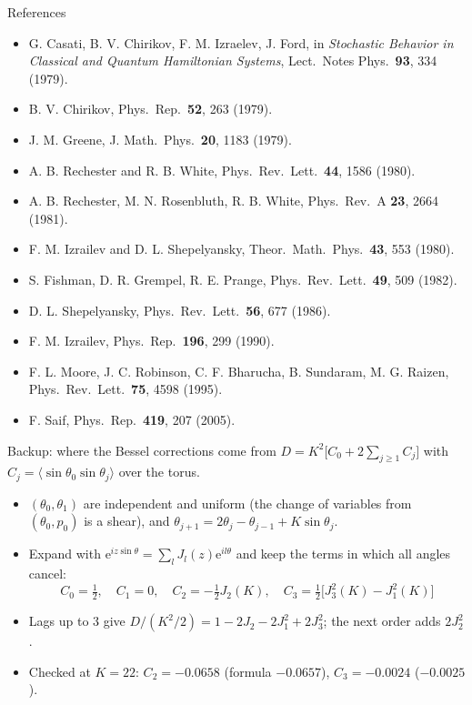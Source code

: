 \documentclass[aspectratio=169,10pt]{beamer}
\newcommand{\avg}[1]{\langle #1 \rangle}
\newcommand{\ee}{\mathrm{e}}
\begin{document}
\begin{frame}{References}
  \scriptsize
  \begin{itemize}
    \item G. Casati, B. V. Chirikov, F. M. Izraelev, J. Ford, in \emph{Stochastic Behavior in Classical and
    Quantum Hamiltonian Systems}, Lect.\ Notes Phys.\ \textbf{93}, 334 (1979).
    \item B. V. Chirikov, Phys.\ Rep.\ \textbf{52}, 263 (1979).
    \item J. M. Greene, J. Math.\ Phys.\ \textbf{20}, 1183 (1979).
    \item A. B. Rechester and R. B. White, Phys.\ Rev.\ Lett.\ \textbf{44}, 1586 (1980).
    \item A. B. Rechester, M. N. Rosenbluth, R. B. White, Phys.\ Rev.\ A \textbf{23}, 2664 (1981).
    \item F. M. Izrailev and D. L. Shepelyansky, Theor.\ Math.\ Phys.\ \textbf{43}, 553 (1980).
    \item S. Fishman, D. R. Grempel, R. E. Prange, Phys.\ Rev.\ Lett.\ \textbf{49}, 509 (1982).
    \item D. L. Shepelyansky, Phys.\ Rev.\ Lett.\ \textbf{56}, 677 (1986).
    \item F. M. Izrailev, Phys.\ Rep.\ \textbf{196}, 299 (1990).
    \item F. L. Moore, J. C. Robinson, C. F. Bharucha, B. Sundaram, M. G. Raizen, Phys.\ Rev.\ Lett.\
    \textbf{75}, 4598 (1995).
    \item F. Saif, Phys.\ Rep.\ \textbf{419}, 207 (2005).
  \end{itemize}
\end{frame}

\appendix

\begin{frame}{Backup: where the Bessel corrections come from}
  \small
  $D = K^2\bigl[C_0 + 2\sum_{j\ge1}C_j\bigr]$ with $C_j = \avg{\sin\theta_0\sin\theta_j}$ over the torus.
  \begin{itemize}
    \item $(\theta_0, \theta_1)$ are independent and uniform (the change of variables from $(\theta_0, p_0)$ is
    a shear), and $\theta_{j+1} = 2\theta_j - \theta_{j-1} + K\sin\theta_j$.
    \item Expand with $\ee^{iz\sin\theta} = \sum_l J_l(z)\ee^{il\theta}$ and keep the terms in which all
    angles cancel:
    \[
      C_0 = \tfrac12,\quad C_1 = 0,\quad C_2 = -\tfrac12 J_2(K),\quad C_3 = \tfrac12\bigl[J_3^2(K) - J_1^2(K)\bigr]
    \]
    \item Lags up to 3 give $D/(K^2/2) = 1 - 2J_2 - 2J_1^2 + 2J_3^2$; the next order adds $2J_2^2$.
    \item Checked at $K = 22$: $C_2 = -0.0658$ (formula $-0.0657$), $C_3 = -0.0024$ ($-0.0025$).
  \end{itemize}
\end{frame}
\end{document}
